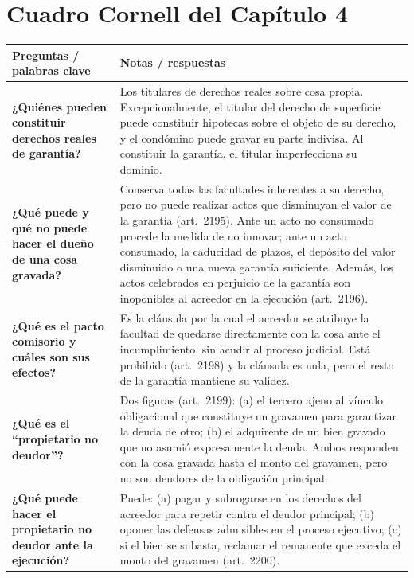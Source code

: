 \documentclass[12pt,oneside]{book}
\begin{document}
\section{Cuadro Cornell del Capítulo 4}

\begin{longtable}{
    >{\raggedright\arraybackslash}p{}
    >{\raggedright\arraybackslash}p{}
}
\toprule
\textbf{Preguntas / palabras clave} & \textbf{Notas / respuestas} \\
\midrule
\endhead
\bottomrule
\endfoot

\textbf{¿Quiénes pueden constituir derechos reales de garantía?} &
Los titulares de derechos reales sobre cosa propia. Excepcionalmente, el titular del derecho de superficie puede constituir hipotecas sobre el objeto de su derecho, y el condómino puede gravar su parte indivisa. Al constituir la garantía, el titular imperfecciona su dominio. \\[0.6em]

\textbf{¿Qué puede y qué no puede hacer el dueño de una cosa gravada?} &
Conserva todas las facultades inherentes a su derecho, pero no puede realizar actos que disminuyan el valor de la garantía (art.~2195). Ante un acto no consumado procede la medida de no innovar; ante un acto consumado, la caducidad de plazos, el depósito del valor disminuido o una nueva garantía suficiente. Además, los actos celebrados en perjuicio de la garantía son inoponibles al acreedor en la ejecución (art.~2196). \\[0.6em]

\textbf{¿Qué es el pacto comisorio y cuáles son sus efectos?} &
Es la cláusula por la cual el acreedor se atribuye la facultad de quedarse directamente con la cosa ante el incumplimiento, sin acudir al proceso judicial. Está prohibido (art.~2198) y la cláusula es nula, pero el resto de la garantía mantiene su validez. \\[0.6em]

\textbf{¿Qué es el ``propietario no deudor''?} &
Dos figuras (art.~2199): (a) el tercero ajeno al vínculo obligacional que constituye un gravamen para garantizar la deuda de otro; (b) el adquirente de un bien gravado que no asumió expresamente la deuda. Ambos responden con la cosa gravada hasta el monto del gravamen, pero no son deudores de la obligación principal. \\[0.6em]

\textbf{¿Qué puede hacer el propietario no deudor ante la ejecución?} &
Puede: (a) pagar y subrogarse en los derechos del acreedor para repetir contra el deudor principal; (b) oponer las defensas admisibles en el proceso ejecutivo; (c) si el bien se subasta, reclamar el remanente que exceda el monto del gravamen (art.~2200). \\[0.6em]


\end{longtable}
\end{document}
